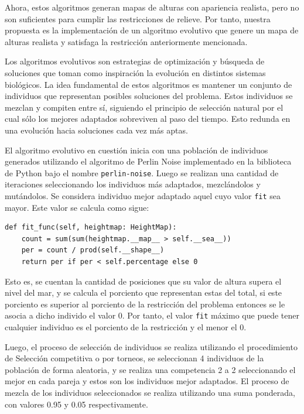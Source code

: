 Ahora, estos algoritmos generan mapas de alturas con apariencia realista, pero no son suficientes para cumplir las restricciones de relieve. Por tanto, nuestra propuesta es la implementación de un algoritmo evolutivo que genere un mapa de alturas realista y satisfaga la restricción anteriormente mencionada.

Los algoritmos evolutivos son estrategias de optimización y búsqueda de soluciones que toman como inspiración la evolución en distintos sistemas biológicos. La idea fundamental de estos algoritmos es mantener un conjunto de individuos que representan posibles soluciones del problema. Estos individuos se mezclan y compiten entre sí, siguiendo el principio de selección natural por el cual sólo los mejores adaptados sobreviven al paso del tiempo. Esto redunda en una evolución hacia soluciones cada vez más aptas. 

El algoritmo evolutivo en cuestión inicia con una población de individuos generados utilizando el algoritmo de Perlin Noise implementado en la biblioteca de Python bajo el nombre \verb|perlin-noise|.	Luego se realizan una cantidad de iteraciones seleccionando los individuos más adaptados, mezclándolos y mutándolos.  Se considera individuo mejor adaptado aquel cuyo valor \verb|fit| sea mayor. Este valor se calcula como sigue:

\begin{verbatim}
def fit_func(self, heightmap: HeightMap):
    count = sum(sum(heightmap.__map__ > self.__sea__))
    per = count / prod(self.__shape__)
    return per if per < self.percentage else 0
\end{verbatim}

Esto es, se cuentan la cantidad de posiciones que su valor de altura supera el nivel del mar, y se calcula el porciento que representan estas del total, si este porciento es superior al porciento de la restricción del problema entonces se le asocia a dicho individo el valor 0.  Por tanto, el valor \verb|fit| máximo que puede tener cualquier individuo es el porciento de la restricción y el menor el 0.

Luego, el proceso de selección de individuos se realiza utilizando el procedimiento de Selección competitiva o por torneos, se seleccionan  4 individuos de la población de forma aleatoria, y se realiza una competencia 2 a 2 seleccionando el mejor en cada pareja y estos son los individuos mejor adaptados. El proceso de mezcla de los individuos seleccionados se realiza utilizando una suma ponderada, con valores 0.95 y 0.05 respectivamente. 

